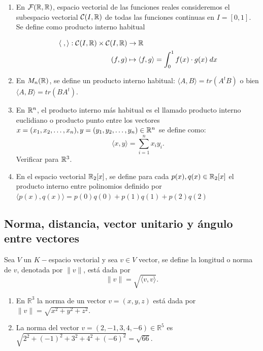 \begin{ejem}
\begin{enumerate}
    \item En $\mathcal{F}(\mathbb{R},\mathbb{R})$, espacio vectorial de las funciones reales consideremos el subespacio vectorial $\mathcal{C}(I,\mathbb{R})$
de todas las funciones continuas en $I = [0,1]$. Se define como producto interno habitual 


\begin{align*}
    \langle \; , \rangle: \mathcal{C}(I,\mathbb{R})\times \mathcal{C}(I,\mathbb{R}) &\to \mathbb{R}\\
    (f, g) &\mapsto \langle f, g\rangle = \int_0^1 f(x) \cdot g(x)\;dx
\end{align*}
    \item En $M_n(\mathbb{R})$, se define un producto interno habitual: $\langle A, B\rangle = tr(A^tB)$ o bien $\langle A, B\rangle = tr(BA^t)$.
    \item En $\mathbb{R}^n$, el  producto interno más habitual es el llamado producto interno euclidiano o producto punto entre los vectores $x = (x_1, x_2, \dots,x_n), y = (y_1, y_2,\dots,y_n) \in \mathbb{R}^n$ se define como:
\[\langle x, y \rangle=\sum_{i=1}^n x_i y_i.\]
Verificar para $\mathbb{R}^3$.

\item En el espacio vectorial $\mathbb{R}_2[x]$, se define para cada $p(x), q(x) \in \mathbb{R}_2[x]$ el producto interno entre polinomios definido por $\langle p(x), q(x)\rangle = p(0)  q(0) + p(1)  q(1) + p(2)  q(2)$
\end{enumerate}
\end{ejem}






\subsection{Norma, distancia, vector unitario y ángulo entre vectores}



\begin{defin}
Sea $V$ un $K-$espacio vectorial y sea $v \in V$ vector, se define la longitud o norma de $v$, denotada por $\|v\|$, está dada por \[\|v\| = \sqrt{\langle v, v\rangle}.\] 
\end{defin}



\begin{ejem}
\begin{enumerate}
    \item En $\mathbb{R}^3$ la norma de un vector $v = (x,y,z)$ está dada por $\|v\| = \sqrt{x^2+y^2+z^2}$.
    \item La norma del vector $v = (2,-1,3,4,-6) \in \mathbb{R}^5$ es $\sqrt{2^2+(-1)^2+3^2+4^2+(-6)^2} = \sqrt{66}$.
\end{enumerate}
\end{ejem}



